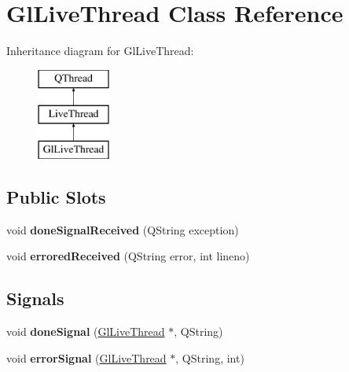 \hypertarget{classGlLiveThread}{\section{Gl\+Live\+Thread Class Reference}
\label{classGlLiveThread}
}
Inheritance diagram for Gl\+Live\+Thread\+:\begin{figure}[H]
\begin{center}
\leavevmode
\includegraphics[height=3.000000cm]{classGlLiveThread}
\end{center}
\end{figure}
\subsection*{Public Slots}
\begin{DoxyCompactItemize}
\item 
\hypertarget{classGlLiveThread_af6fd5e5395e5a08d44b7d666209c36a3}{void {\bfseries done\+Signal\+Received} (Q\+String exception)}\label{classGlLiveThread_af6fd5e5395e5a08d44b7d666209c36a3}

\item 
\hypertarget{classGlLiveThread_a070e3978c7bcf1121e6343f6dcf54847}{void {\bfseries errored\+Received} (Q\+String error, int lineno)}\label{classGlLiveThread_a070e3978c7bcf1121e6343f6dcf54847}

\end{DoxyCompactItemize}
\subsection*{Signals}
\begin{DoxyCompactItemize}
\item 
\hypertarget{classGlLiveThread_aaf79277230ec2aae08bad4db48c2614c}{void {\bfseries done\+Signal} (\hyperlink{classGlLiveThread}{Gl\+Live\+Thread} $\ast$, Q\+String)}\label{classGlLiveThread_aaf79277230ec2aae08bad4db48c2614c}

\item 
\hypertarget{classGlLiveThread_ad8563a7fcd4dc42d1dcf7a85b087d40e}{void {\bfseries error\+Signal} (\hyperlink{classGlLiveThread}{Gl\+Live\+Thread} $\ast$, Q\+String, int)}\label{classGlLiveThread_ad8563a7fcd4dc42d1dcf7a85b087d40e}

\end{DoxyCompactItemize}
